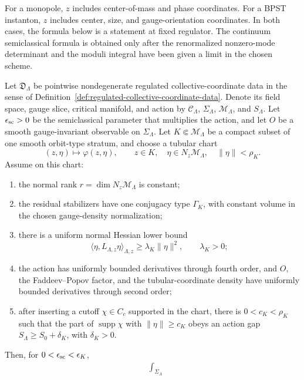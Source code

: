 For a monopole, \(z\) includes center-of-mass and phase coordinates.  For a
BPST instanton, \(z\) includes center, size, and gauge-orientation
coordinates.  In both cases, the formula below is a statement at fixed
regulator.  The continuum semiclassical formula is obtained only after the
renormalized nonzero-mode determinant and the moduli integral have been
given a limit in the chosen scheme.

\begin{theorem}
\label{thm:collective-coordinate-morse-bott-measure}
Let \(\mathfrak D_\Lambda\) be pointwise nondegenerate regulated
collective-coordinate data in the sense of
Definition~\ref{def:regulated-collective-coordinate-data}.  Denote its
field space, gauge slice, critical manifold, and action by
\(\mathcal C_\Lambda\), \(\Sigma_\Lambda\), \(\mathcal M_\Lambda\), and
\(S_\Lambda\).  Let \(\epsilon_{\rm sc}>0\) be the semiclassical parameter
that multiplies the action, and let \(O\) be a smooth gauge-invariant
observable on \(\Sigma_\Lambda\).  Let \(K\Subset\mathcal M_\Lambda\) be a compact
subset of one smooth orbit-type stratum, and choose a tubular chart
\[
  (z,\eta)\longmapsto \varphi(z,\eta),
  \qquad
  z\in K,\quad \eta\in N_z\mathcal M_\Lambda,\quad \|\eta\|<\rho_K .
\]
Assume on this chart:
\begin{enumerate}[label=(\roman*)]
\item the normal rank \(r=\dim N_z\mathcal M_\Lambda\) is constant;
\item the residual stabilizers have one conjugacy type \(\Gamma_K\), with
  constant volume in the chosen gauge-density normalization;
\item there is a uniform normal Hessian lower bound
  \[
    \langle\eta,L_{\Lambda,z}\eta\rangle_{\Lambda,z}
    \ge \lambda_K\|\eta\|^2,\qquad \lambda_K>0 ;
  \]
\item the action has uniformly bounded derivatives through fourth order, and
  \(O\), the Faddeev--Popov factor, and the tubular-coordinate density have
  uniformly bounded derivatives through second order;
\item after inserting a cutoff \(\chi\in C_c\) supported in the chart, there is
  \(0<c_K<\rho_K\) such that the part of \(\operatorname{supp}\chi\) with
  \(\|\eta\|\ge c_K\) obeys an action gap
  \(S_\Lambda\ge S_0+\delta_K\), with \(\delta_K>0\).
\end{enumerate}
Then, for \(0<\epsilon_{\rm sc}<\epsilon_K\),
\begin{align}
  &\int_{\Sigma_\Lambda}

\end{align}
\end{theorem}
